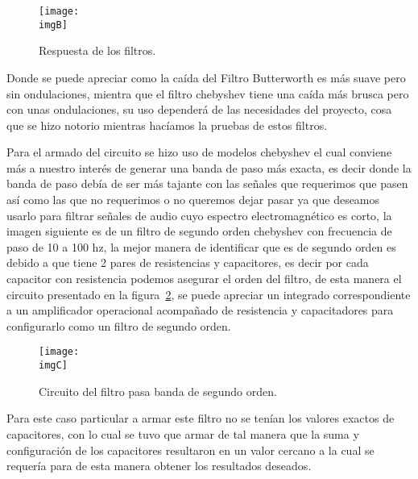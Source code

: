 \documentclass[a4paper,12pt]{article}
\newcommand{\imgB}{img/graficas.png}
\newcommand{\imgC}{img/FiltroPasaBanda2.jpg}
\begin{document}
        \begin{figure}[H] 
            \centering 
            \texttt{[image: \\imgB]} 
            \caption{Respuesta de los filtros.} 
            \label{fig:B} 
        \end{figure} 

        Donde se puede apreciar como la caída del Filtro Butterworth es más suave pero sin ondulaciones, mientra que el filtro chebyshev tiene una caída más brusca pero con unas ondulaciones, su uso dependerá de las necesidades del proyecto, cosa que se hizo notorio mientras hacíamos la pruebas de estos filtros.

        Para el armado del circuito se hizo uso de modelos chebyshev el cual conviene más a nuestro interés de generar una banda de paso más exacta, es decir donde la banda de paso debía de ser más tajante con las señales que requerimos que pasen así como las que no requerimos o no queremos dejar pasar ya que deseamos usarlo para filtrar señales de audio cuyo espectro electromagnético es corto, la imagen siguiente es de un filtro de segundo orden chebyshev con frecuencia de paso de 10 a 100 hz, la mejor manera de identificar que es de segundo orden es debido a que tiene 2 pares de resistencias y capacitores, es decir por cada capacitor con resistencia podemos asegurar el orden del filtro, de esta manera el circuito presentado en la figura~\ref{fig:C}, se puede apreciar un integrado correspondiente a un amplificador operacional acompañado de resistencia y capacitadores para configurarlo como un filtro de segundo orden.

        \begin{figure}[H] 
            \centering 
            \texttt{[image: \\imgC]} 
            \caption{Circuito del filtro pasa banda de segundo orden.} 
            \label{fig:C} 
        \end{figure} 

        Para este caso particular a armar este filtro no se tenían los valores exactos de capacitores, con lo cual se tuvo que armar de tal manera que la suma y configuración de los capacitores resultaron en un valor cercano a la cual se requería para de esta manera obtener los resultados deseados.
\end{document}
